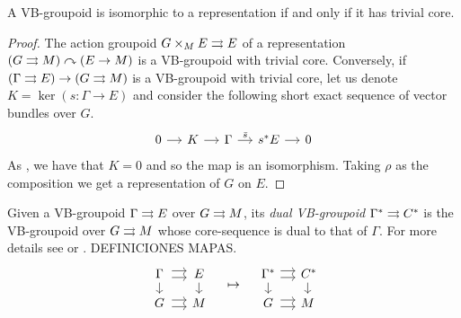 \begin{prop}
A VB-groupoid is isomorphic to a representation if and only if it has trivial core.
\end{prop}

\begin{proof}
The action groupoid $G\times_M E\rightrightarrows E$ of a representation $(G\rightrightarrows M)\curvearrowright (E\to M)$ is a VB-groupoid with trivial core.
Conversely, if $(\Gamma\rightrightarrows E)\to (G\rightrightarrows M)$ is a VB-groupoid with trivial core, let us denote $K=\ker(s\colon\Gamma\to E)$ and consider the following short exact sequence of vector bundles over $G$.
\begin{equation}
  \begin{tikzcd}[sep=small]
    0 \ar{r} & K \ar{r} & \Gamma \ar{r}{\bar s} & s^*E \ar{r} & 0
  \end{tikzcd}
\end{equation}
As , we have that $K = 0$ and so the map  is an isomorphism.
Taking $\rho$ as the composition  we get a representation of $G$ on $E$.
\end{proof}

Given a VB-groupoid $\Gamma\rightrightarrows E$ over $G\rightrightarrows M$, its \emph{dual VB-groupoid} $\Gamma^*\rightrightarrows C^*$ is the VB-groupoid over $G\rightrightarrows M$ whose core-sequence is dual to that of $\Gamma$. For more details see \cite{mack05} or \cite{gsm17}. DEFINICIONES MAPAS.
\begin{equation}
  \begin{tikzcd}[sep=small, cells={text width={width("$M$")}}, align=center]
    \Gamma \ar[yshift=3pt]{r} \ar[yshift=-2.3pt]{r} \ar{d} & E \ar{d} \\
    G \ar[yshift=3pt]{r} \ar[yshift=-2.3pt]{r} & M
  \end{tikzcd}
  \quad \mapsto \quad
  \begin{tikzcd}[sep=small, cells={text width={width("$M$")}}, align=center]
    \Gamma^* \ar[yshift=3pt]{r} \ar[yshift=-2.3pt]{r} \ar{d} & C^* \ar{d} \\
    G \ar[yshift=3pt]{r} \ar[yshift=-2.3pt]{r} & M
  \end{tikzcd}
\end{equation}

